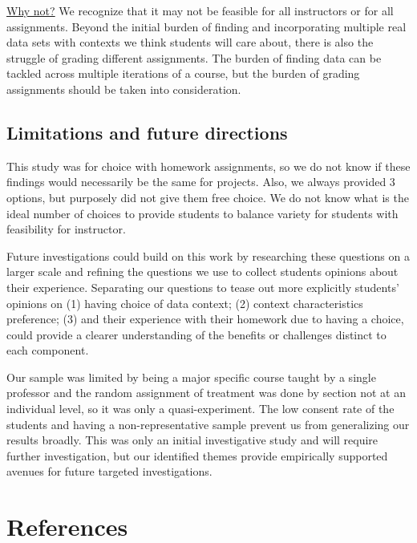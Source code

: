 \documentclass[
  12pt]{article}
\begin{document}
\underline{Why not?} We recognize that it may not be feasible for all
instructors or for all assignments. Beyond the initial burden of finding
and incorporating multiple real data sets with contexts we think
students will care about, there is also the struggle of grading
different assignments. The burden of finding data can be tackled across
multiple iterations of a course, but the burden of grading assignments
should be taken into consideration.

\subsection{Limitations and future
directions}\label{limitations-and-future-directions}

This study was for choice with homework assignments, so we do not know
if these findings would necessarily be the same for projects. Also, we
always provided 3 options, but purposely did not give them free choice.
We do not know what is the ideal number of choices to provide students
to balance variety for students with feasibility for instructor.

Future investigations could build on this work by researching these
questions on a larger scale and refining the questions we use to collect
students opinions about their experience. Separating our questions to
tease out more explicitly students' opinions on (1) having choice of
data context; (2) context characteristics preference; (3) and their
experience with their homework due to having a choice, could provide a
clearer understanding of the benefits or challenges distinct to each
component.

Our sample was limited by being a major specific course taught by a
single professor and the random assignment of treatment was done by
section not at an individual level, so it was only a quasi-experiment.
The low consent rate of the students and having a non-representative
sample prevent us from generalizing our results broadly. This was only
an initial investigative study and will require further investigation,
but our identified themes provide empirically supported avenues for
future targeted investigations.

\newpage

\section*{References}\label{references}

\renewcommand{\bibsection}{}

\end{document}
